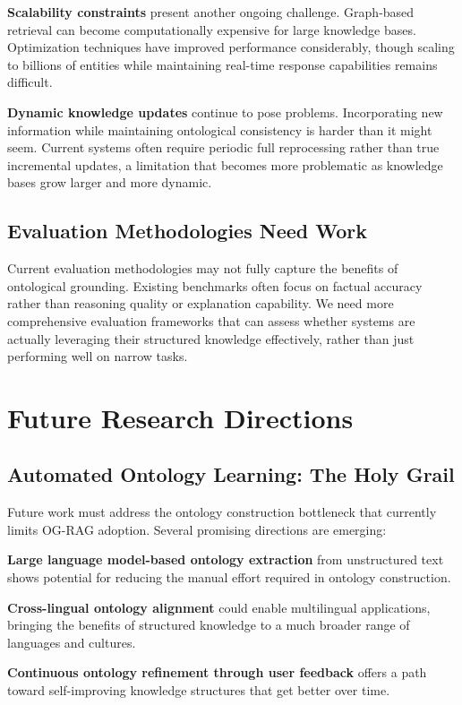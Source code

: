 \textbf{Scalability constraints} present another ongoing challenge. Graph-based retrieval can become computationally expensive for large knowledge bases. Optimization techniques have improved performance considerably, though scaling to billions of entities while maintaining real-time response capabilities remains difficult.

\textbf{Dynamic knowledge updates} continue to pose problems. Incorporating new information while maintaining ontological consistency is harder than it might seem. Current systems often require periodic full reprocessing rather than true incremental updates, a limitation that becomes more problematic as knowledge bases grow larger and more dynamic.

\subsection{Evaluation Methodologies Need Work}

Current evaluation methodologies may not fully capture the benefits of ontological grounding. Existing benchmarks often focus on factual accuracy rather than reasoning quality or explanation capability. We need more comprehensive evaluation frameworks that can assess whether systems are actually leveraging their structured knowledge effectively, rather than just performing well on narrow tasks.

\section{Future Research Directions}

\subsection{Automated Ontology Learning: The Holy Grail}

Future work must address the ontology construction bottleneck that currently limits OG-RAG adoption. Several promising directions are emerging:

\textbf{Large language model-based ontology extraction} from unstructured text shows potential for reducing the manual effort required in ontology construction.

\textbf{Cross-lingual ontology alignment} could enable multilingual applications, bringing the benefits of structured knowledge to a much broader range of languages and cultures.

\textbf{Continuous ontology refinement through user feedback} offers a path toward self-improving knowledge structures that get better over time.

